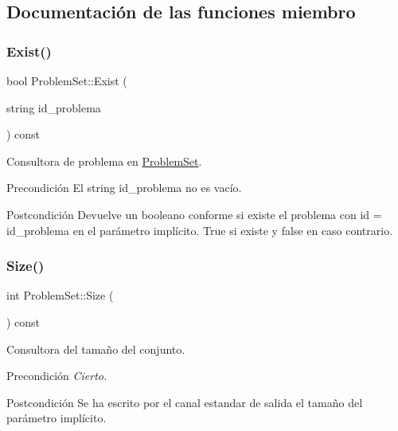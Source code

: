 \subsection{Documentación de las funciones miembro}
\mbox{\label{class_problem_set_a51774196cd2b29bfc0e0adcca8dd325d}} 
\subsubsection{\texorpdfstring{Exist()}{Exist()}}
{\footnotesize\ttfamily bool Problem\+Set\+::\+Exist (\begin{DoxyParamCaption}\item[{string}]{id\+\_\+problema }\end{DoxyParamCaption}) const}



Consultora de problema en \mbox{\hyperlink{class_problem_set}{Problem\+Set}}. 

\begin{DoxyPrecond}{Precondición}
El string id\+\_\+problema no es vacío. 
\end{DoxyPrecond}
\begin{DoxyPostcond}{Postcondición}
Devuelve un booleano conforme si existe el problema con id = id\+\_\+problema en el parámetro implícito. True si existe y false en caso contrario. 
\end{DoxyPostcond}
\mbox{\label{class_problem_set_ac173526274dc6d5f88623c3dd2630cd6}} 
\subsubsection{\texorpdfstring{Size()}{Size()}}
{\footnotesize\ttfamily int Problem\+Set\+::\+Size (\begin{DoxyParamCaption}{ }\end{DoxyParamCaption}) const}



Consultora del tamaño del conjunto. 

\begin{DoxyPrecond}{Precondición}
{\itshape Cierto.} 
\end{DoxyPrecond}
\begin{DoxyPostcond}{Postcondición}
Se ha escrito por el canal estandar de salida el tamaño del parámetro implícito. 
\end{DoxyPostcond}
\mbox{\label{class_problem_set_a8fd763c7dbee07a8f0101119f23e694a}} 
